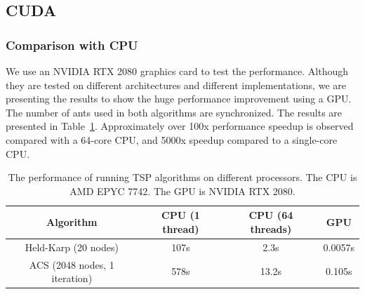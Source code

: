 \documentclass{article}
\begin{document}
\subsection{CUDA}

\subsubsection{Comparison with CPU}
We use an NVIDIA RTX 2080 graphics card to test the performance. Although they are tested on different architectures and different implementations, we are presenting the results to show the huge performance improvement using a GPU. The number of ants used in both algorithms are synchronized. The results are presented in Table~\ref{tab:cpu_gpu}. Approximately over 100x performance speedup is observed compared with a 64-core CPU, and 5000x speedup compared to a single-core CPU. 
\begin{table}[]
    \centering
    \begin{tabular}{c|c|c|c}
        Algorithm & CPU (1 thread) & CPU (64 threads) & GPU \\\hline
        Held-Karp (20 nodes) & 107s & 2.3s & 0.0057s  \\ \hline
        ACS (2048 nodes, 1 iteration) & 578s & 13.2s & 0.105s \\
    \end{tabular}
    \caption{The performance of running TSP algorithms on different processors. The CPU is  AMD EPYC 7742. The GPU is NVIDIA RTX 2080.}
    \label{tab:cpu_gpu}
\end{table}
\end{document}
